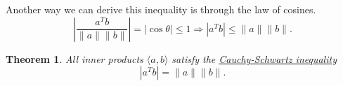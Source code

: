 \documentclass[reqno]{amsart}
\newtheorem{thm}{Theorem}
\theoremstyle{definition}
\begin{document}
Another way we can derive this inequality is through the law of cosines.
%
\begin{equation*}
\left\vert\frac{a^Tb}{\|a\|\|b\|}\right\vert = |\cos\theta| \leq 1 \Rightarrow |a^Tb| \leq \|a\|\|b\|.
\end{equation*}


\begin{thm}
All inner products $\langle a,b\rangle$ satisfy the \underline{\color{red}Cauchy-Schwartz inequality}
%
\begin{equation}
\left\vert a^Tb\right\vert = \|a\|\|b\|.
\end{equation}
\end{thm}
\end{document}
